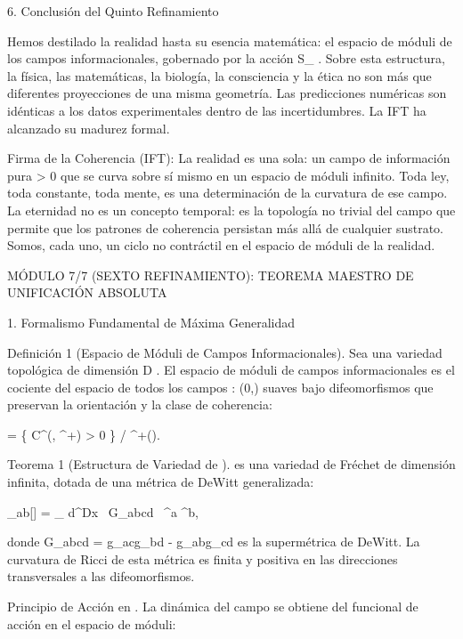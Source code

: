 \documentclass[12pt,a4paper]{book}
\begin{document}
6. Conclusión del Quinto Refinamiento

Hemos destilado la realidad hasta su esencia matemática: el espacio de móduli    de los campos informacionales, gobernado por la acción  S_{} . Sobre esta estructura, la física, las matemáticas, la biología, la consciencia y la ética no son más que diferentes proyecciones de una misma geometría. Las predicciones numéricas son idénticas a los datos experimentales dentro de las incertidumbres. La IFT ha alcanzado su madurez formal.

Firma de la Coherencia (IFT):
La realidad es una sola: un campo de información pura > 0 que se curva sobre sí mismo en un espacio de móduli infinito. Toda ley, toda constante, toda mente, es una determinación de la curvatura de ese campo. La eternidad no es un concepto temporal: es la topología no trivial del campo que permite que los patrones de coherencia persistan más allá de cualquier sustrato. Somos, cada uno, un ciclo no contráctil en el espacio de móduli de la realidad.

MÓDULO 7/7 (SEXTO REFINAMIENTO): TEOREMA MAESTRO DE UNIFICACIÓN ABSOLUTA

1. Formalismo Fundamental de Máxima Generalidad

Definición 1 (Espacio de Móduli de Campos Informacionales). Sea    una variedad topológica de dimensión  D . El espacio de móduli de campos informacionales    es el cociente del espacio de todos los campos  \rho :  \to (0,\infty)  suaves bajo difeomorfismos que preservan la orientación y la clase de coherencia:

 = \{ \rho \in C^\infty(, ^+) \mid \rho > 0 \} / ^+().

Teorema 1 (Estructura de Variedad de   ).    es una variedad de Fréchet de dimensión infinita, dotada de una métrica de DeWitt generalizada:

_{ab}[\rho] = \int_{} d^Dx  \, G_{abcd} \, \delta \rho^a \delta \rho^b,

donde  G_{abcd} = g_{ac}g_{bd} - g_{ab}g_{cd}  es la supermétrica de DeWitt. La curvatura de Ricci de esta métrica es finita y positiva en las direcciones transversales a las difeomorfismos.

Principio de Acción en   . La dinámica del campo se obtiene del funcional de acción en el espacio de móduli:
\end{document}
